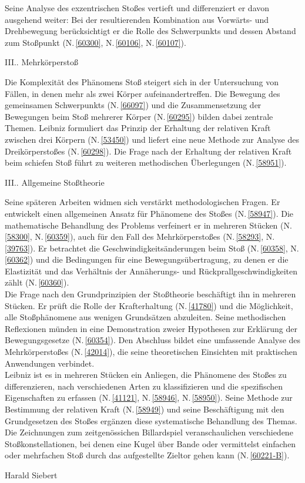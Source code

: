 Seine Analyse des exzentrischen Stoßes vertieft und differenziert er davon ausgehend weiter: Bei der resultierenden Kombination aus Vorwärts- und Drehbewegung berücksichtigt er die Rolle des Schwerpunkts und dessen Abstand zum Stoßpunkt (N.\,\ref{60300}, N.\,\ref{60106}, N.\,\ref{60107}).
\par
\vspace{1.0em}
\noindent
III.. Mehrkörperstoß%
\par \noindent
Die Komplexität des Phänomens Stoß steigert sich in der Untersuchung von Fällen, in denen mehr als zwei Körper aufeinandertreffen. Die Bewegung des gemeinsamen Schwerpunkts (N.\,\ref{66097}) und die Zusammensetzung der Bewegungen beim Stoß mehrerer Körper (N.\,\ref{60295}) bilden dabei zentrale Themen. Leibniz formuliert das Prinzip der Erhaltung der relativen Kraft zwischen drei Körpern (N.\,\ref{53450}) und liefert eine neue Methode zur Analyse des Dreikörperstoßes (N.\,\ref{60298}). Die Frage nach der Erhaltung der relativen Kraft beim schiefen Stoß führt zu weiteren methodischen Überlegungen (N.\,\ref{58951}).%
\par
\vspace{1.0em}
\noindent
III.. Allgemeine Stoßtheorie%
\par \noindent
Seine späteren Arbeiten widmen sich verstärkt methodologischen Fragen. Er entwickelt einen allgemeinen Ansatz für Phänomene des Stoßes (N.\,\ref{58947}). Die mathematische Behandlung des Problems verfeinert er in mehreren Stücken (N.\,\ref{58300}, N.\,\ref{60359}), auch für den Fall des Mehrkörperstoßes (N.\,\ref{58293}, N.\,\ref{39763}). Er betrachtet die Geschwindigkeitsänderungen beim Stoß (N.\,\ref{60358}, N.\,\ref{60362}) und die Bedingungen für eine Bewegungsübertragung, zu denen er die Elastizität und das Verhältnis der Annäherungs- und Rückprallgeschwindigkeiten zählt (N.\,\ref{60360}).%
\\ \indent
Die Frage nach den Grundprinzipien der Stoßtheorie beschäftigt ihn in mehreren Stücken. Er prüft die Rolle der Krafterhaltung (N.\,\ref{41780}) und die Möglichkeit, alle Stoßphänomene aus wenigen Grundsätzen abzuleiten. Seine methodischen Reflexionen münden in eine Demonstration zweier Hypothesen zur Erklärung der Bewegungsgesetze (N.\,\ref{60354}). Den Abschluss bildet eine umfassende Analyse des Mehrkörperstoßes (N.\,\ref{42014}), die seine theoretischen Einsichten mit praktischen Anwendungen verbindet.
\\ \indent
Leibniz ist es in mehreren Stücken ein Anliegen, die Phänomene des Stoßes zu differenzieren, nach verschiedenen Arten zu klassifizieren und die spezifischen Eigenschaften zu erfassen (N.\,\ref{41121}, N.\,\ref{58946}, N.\,\ref{58950}). Seine Methode zur Bestimmung der relativen Kraft (N.\,\ref{58949}) und seine Beschäftigung mit den Grundgesetzen des Stoßes ergänzen diese systematische Behandlung des Themas. Die Zeichnungen zum zeitgenössichen Billardspiel veranschaulichen verschiedene Stoßkonstellationen, bei denen eine Kugel über Bande oder vermittelst einfachen oder mehrfachen Stoß durch das aufgestellte Zieltor gehen kann (N.\,\ref{60221-B}).  
\par
\vspace*{3em}
\hspace{104mm}Harald Siebert
